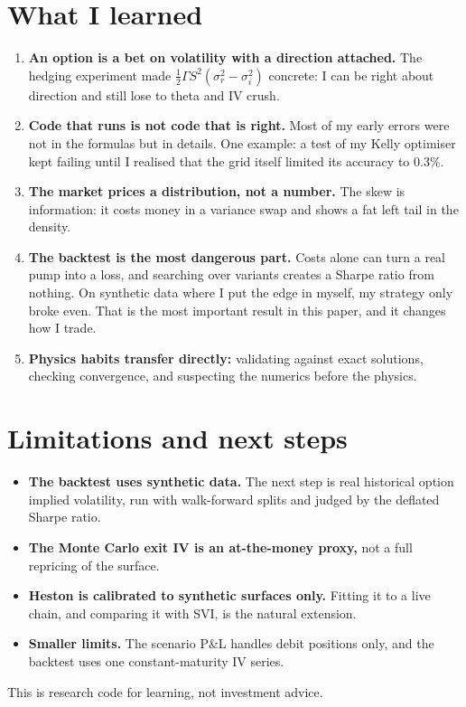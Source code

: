 \documentclass[11pt,a4paper]{article}
\begin{document}
\section{What I learned}
\begin{enumerate}[leftmargin=1.5em]
  \item \textbf{An option is a bet on volatility with a direction attached.} The hedging experiment made $\frac12\Gamma S^2(\sigma_r^2-\sigma_i^2)$ concrete: I can be right about direction and still lose to theta and IV crush.
  \item \textbf{Code that runs is not code that is right.} Most of my early errors were not in the formulas but in details. One example: a test of my Kelly optimiser kept failing until I realised that the grid itself limited its accuracy to 0.3\%.
  \item \textbf{The market prices a distribution, not a number.} The skew is information: it costs money in a variance swap and shows a fat left tail in the density.
  \item \textbf{The backtest is the most dangerous part.} Costs alone can turn a real pump into a loss, and searching over variants creates a Sharpe ratio from nothing. On synthetic data where I put the edge in myself, my strategy only broke even. That is the most important result in this paper, and it changes how I trade.
  \item \textbf{Physics habits transfer directly:} validating against exact solutions, checking convergence, and suspecting the numerics before the physics.
\end{enumerate}

\section{Limitations and next steps}
\begin{itemize}[leftmargin=1.5em]
  \item \textbf{The backtest uses synthetic data.} The next step is real historical option implied volatility, run with walk-forward splits and judged by the deflated Sharpe ratio.
  \item \textbf{The Monte Carlo exit IV is an at-the-money proxy,} not a full repricing of the surface.
  \item \textbf{Heston is calibrated to synthetic surfaces only.} Fitting it to a live chain, and comparing it with SVI, is the natural extension.
  \item \textbf{Smaller limits.} The scenario P\&L handles debit positions only, and the backtest uses one constant-maturity IV series.
\end{itemize}
This is research code for learning, not investment advice.
\end{document}

